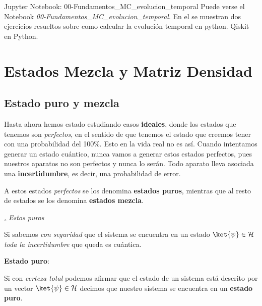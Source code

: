 \documentclass[a4paper,11pt]{book} %
\numberwithin{equation}{chapter}
\def\subsubiContadorIt{\par\addtocounter{subsubsection}{1}\underline{\it\thesubsubsection.}\hskip0.5cm \setcounter{subsubsubsectionIt}{0}}
\newcommand{\SubsubiIt}[1]{
		\subsubiContadorIt \textit{#1}
	}
\newcounter{subsubsubsectionIt}[subsubsection]
\begin{document}
		
	    \begin{mybox_orange}{Jupyter Notebook: 00-Fundamentos\_MC\_evolucion\_temporal}
    Puede verse el Notebook \textit{00-Fundamentos\_MC\_evolucion\_temporal}. En el se muestran dos ejercicios resueltos sobre como calcular la evolución temporal en python.
    Qiskit en Python.
    \end{mybox_orange}
		
		
		
	\section{Estados Mezcla y Matriz Densidad}



		\subsection{Estado puro y mezcla}

Hasta ahora hemos estado estudiando casos \textbf{ideales}, donde los estados que tenemos son \textit{perfectos}, en el sentido de que tenemos el estado que creemos tener con una probabilidad del 100\%. Esto en la vida real no es así. Cuando intentamos generar un estado cuántico, nunca vamos a generar estos estados perfectos, pues nuestros aparatos no son perfectos y nunca lo serán. Todo aparato lleva asociada una \textbf{incertidumbre}, es decir, una probabilidad de error.

A estos estados \textit{perfectos} se los denomina \textbf{estados puros}, mientras que al resto de estados se los denomina \textbf{estados mezcla}.

			\SubsubiIt{Estos puros}
			
Si sabemos \textit{con seguridad} que el  sistema se encuentra en un estado $\ket{\psi}\in \mathcal{H}$ \textit{toda la incertidumbre} que queda es cuántica.

	\begin{mybox_gray2}{}
	\textbf{Estado puro}:
	
	Si con \textit{certeza total} podemos afirmar que el estado de un sistema está descrito por un vector $\ket{\psi}\in \mathcal{H}$ decimos que nuestro sistema se encuentra en un \textbf{estado puro}.
	\end{mybox_gray2}
\end{document}

